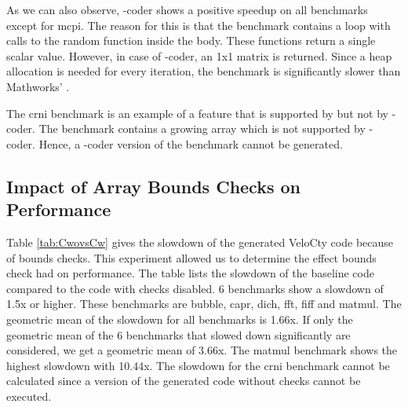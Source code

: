 As we can also observe, \matlab-coder shows a positive speedup on all benchmarks except for \textsf{mcpi}. The reason for this is that the benchmark contains a loop with calls to the random function inside the body. These functions return a single scalar value. However, in case of \matlab-coder, an 1x1 matrix is returned. Since a heap allocation is needed for every iteration, the benchmark is significantly slower than Mathworks' \matlab. 

The \textsf{crni} benchmark is an example of a feature that is supported by \velocty but not by \matlab-coder. The benchmark contains a growing array which is not supported by \matlab-coder. Hence, a \matlab-coder version of the benchmark cannot be generated. 

\subsection{Impact of Array Bounds Checks on Performance}
Table \ref{tab:CwovsCw} gives the slowdown of the generated VeloCty code because of bounds checks. This experiment allowed us to determine the effect bounds check had on performance. The table lists the slowdown of the baseline \velocty code compared to the \velocty code with checks disabled. 6 benchmarks show a slowdown of 1.5x or higher. These benchmarks are \textsf{bubble}, \textsf{capr}, \textsf{dich}, \textsf{fft}, \textsf{fiff} and \textsf{matmul}. The geometric mean of the slowdown for all benchmarks is 1.66x. If only the geometric mean of the  6 benchmarks that slowed down significantly  are considered, we get a geometric mean of 3.66x. The matmul benchmark shows the highest slowdown with 10.44x. The slowdown for the \textsf{crni} benchmark cannot be calculated since a version of the generated code without checks cannot be executed. 

